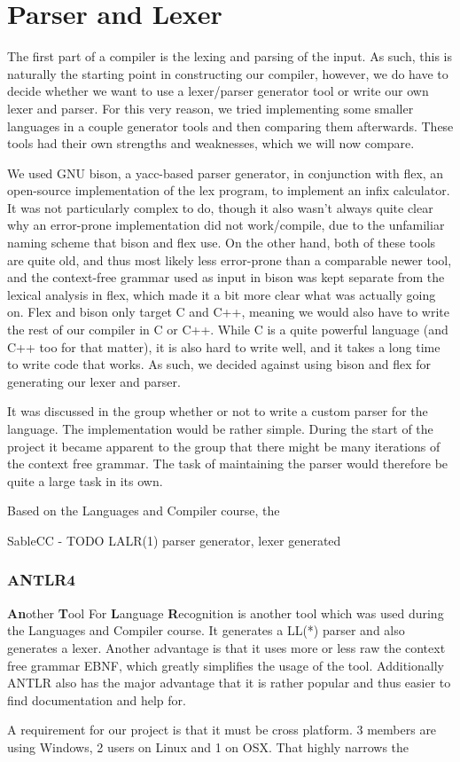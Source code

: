 \section{Parser and Lexer}
The first part of a compiler is the lexing and parsing of the input. As such, this is naturally the starting point in constructing our compiler, however, we do have to decide whether we want to use a lexer/parser generator tool or write our own lexer and parser.
For this very reason, we tried implementing some smaller languages in a couple generator tools and then comparing them afterwards. These tools had their own strengths and weaknesses, which we will now compare.

We used GNU bison, a yacc-based parser generator, in conjunction with flex, an open-source implementation of the lex program, to implement an infix calculator. It was not particularly complex to do, though it also wasn't always quite clear why an error-prone implementation did not work/compile, due to the unfamiliar naming scheme that bison and flex use.
On the other hand, both of these tools are quite old, and thus most likely less error-prone than a comparable newer tool, and the context-free grammar used as input in bison was kept separate from the lexical analysis in flex, which made it a bit more clear what was actually going on.
Flex and bison only target C and C++, meaning we would also have to write the rest of our compiler in C or C++. While C is a quite powerful language (and C++ too for that matter), it is also hard to write well, and it takes a long time to write code that works. As such, we decided against using bison and flex for generating our lexer and parser.

It was discussed in the group whether or not to write a custom parser for the language. The implementation would be rather simple. During the start of the project it became apparent to the group that there might be many iterations of the context free grammar. The task of maintaining the parser would therefore be quite a large task in its own.

Based on the Languages and Compiler course, the 

SableCC - TODO LALR(1) parser generator, lexer generated

\subsubsection{ANTLR4}
\textbf{An}other \textbf{T}ool For \textbf{L}anguage \textbf{R}ecognition is another tool which was used during the Languages and Compiler course. It generates a LL(*) parser and also generates a lexer. Another advantage is that it uses more or less raw the context free grammar EBNF, which greatly simplifies the usage of the tool. Additionally ANTLR also has the major advantage that it is rather popular and thus easier to find documentation and help for. 


A requirement for our project is that it must be cross platform. 3 members are using Windows, 2 users on Linux and 1 on OSX. That highly narrows the 